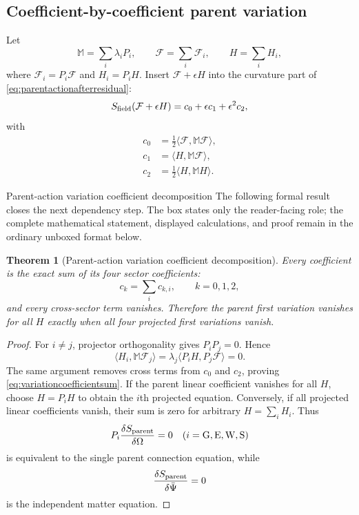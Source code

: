 \documentclass[11pt]{article}
\numberwithin{equation}{section}
\newtheorem{theorem}[definition]{Theorem}
\theoremstyle{remark}
\begin{document}
\subsection{Coefficient-by-coefficient parent variation}
Let
\begin{equation}
\mathbb M=\sum_i\lambda_iP_i,
\qquad
\mathcal F=\sum_i\mathcal F_i,
\qquad
H=\sum_iH_i,
\end{equation}
where $\mathcal F_i=P_i\mathcal F$ and $H_i=P_iH$.  Insert $\mathcal F+\epsilon H$ into the curvature part of \eqref{eq:parentactionafterresidual}:
\begin{equation}
S_{\rm field}(\mathcal F+\epsilon H)=c_0+\epsilon c_1+\epsilon^2c_2,
\end{equation}
with
\begin{align}
c_0&=\frac12\langle\mathcal F,\mathbb M\mathcal F\rangle,\\
c_1&=\langle H,\mathbb M\mathcal F\rangle,\\
c_2&=\frac12\langle H,\mathbb M H\rangle.
\end{align}

\begin{proofguide}{Parent-action variation coefficient decomposition}
The following formal result closes the next dependency step. The box states only the reader-facing role; the complete mathematical statement, displayed calculations, and proof remain in the ordinary unboxed format below.
\end{proofguide}
\begin{theorem}[Parent-action variation coefficient decomposition]
Every coefficient is the exact sum of its four sector coefficients:
\begin{equation}
c_k=\sum_i c_{k,i},\qquad k=0,1,2,
\label{eq:variationcoefficientsum}
\end{equation}
and every cross-sector term vanishes.  Therefore the parent first variation vanishes for all $H$ exactly when all four projected first variations vanish.
\end{theorem}
\begin{proof}
For $i\ne j$, projector orthogonality gives $P_iP_j=0$.  Hence
\begin{equation}
\langle H_i,\mathbb M\mathcal F_j\rangle
=\lambda_j\langle P_iH,P_j\mathcal F\rangle=0.
\end{equation}
The same argument removes cross terms from $c_0$ and $c_2$, proving \eqref{eq:variationcoefficientsum}.  If the parent linear coefficient vanishes for all $H$, choose $H=P_iH$ to obtain the $i$th projected equation.  Conversely, if all projected linear coefficients vanish, their sum is zero for arbitrary $H=\sum_iH_i$.  Thus
\begin{equation}
P_i\frac{\delta S_{\rm parent}}{\delta\Omega}=0
\quad(i={\rm G,E,W,S})
\end{equation}
is equivalent to the single parent connection equation, while
\begin{equation}
\frac{\delta S_{\rm parent}}{\delta\bar\Psi}=0
\end{equation}
is the independent matter equation.
\end{proof}
\end{document}

